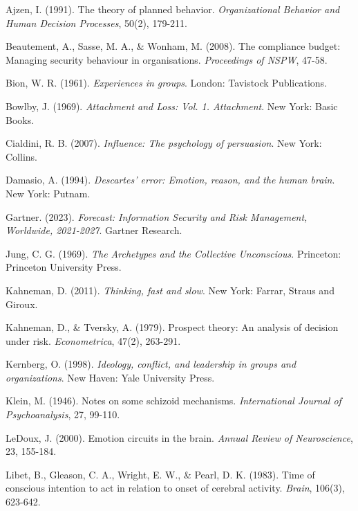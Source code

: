 \documentclass[11pt,a4paper]{article}
\begin{document}
\begin{thebibliography}{99}

Ajzen, I. (1991). The theory of planned behavior. \textit{Organizational Behavior and Human Decision Processes}, 50(2), 179-211.

Beautement, A., Sasse, M. A., \& Wonham, M. (2008). The compliance budget: Managing security behaviour in organisations. \textit{Proceedings of NSPW}, 47-58.

Bion, W. R. (1961). \textit{Experiences in groups}. London: Tavistock Publications.

Bowlby, J. (1969). \textit{Attachment and Loss: Vol. 1. Attachment}. New York: Basic Books.

Cialdini, R. B. (2007). \textit{Influence: The psychology of persuasion}. New York: Collins.

Damasio, A. (1994). \textit{Descartes' error: Emotion, reason, and the human brain}. New York: Putnam.

Gartner. (2023). \textit{Forecast: Information Security and Risk Management, Worldwide, 2021-2027}. Gartner Research.

Jung, C. G. (1969). \textit{The Archetypes and the Collective Unconscious}. Princeton: Princeton University Press.

Kahneman, D. (2011). \textit{Thinking, fast and slow}. New York: Farrar, Straus and Giroux.

Kahneman, D., \& Tversky, A. (1979). Prospect theory: An analysis of decision under risk. \textit{Econometrica}, 47(2), 263-291.

Kernberg, O. (1998). \textit{Ideology, conflict, and leadership in groups and organizations}. New Haven: Yale University Press.

Klein, M. (1946). Notes on some schizoid mechanisms. \textit{International Journal of Psychoanalysis}, 27, 99-110.

LeDoux, J. (2000). Emotion circuits in the brain. \textit{Annual Review of Neuroscience}, 23, 155-184.

Libet, B., Gleason, C. A., Wright, E. W., \& Pearl, D. K. (1983). Time of conscious intention to act in relation to onset of cerebral activity. \textit{Brain}, 106(3), 623-642.


\end{thebibliography}
\end{document}
